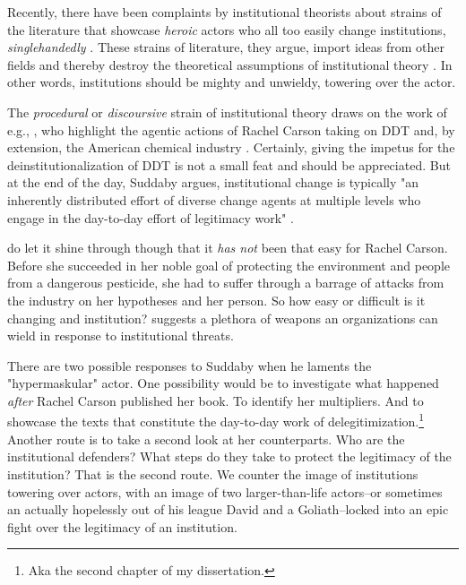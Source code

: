 
Recently, there have been complaints by institutional theorists about strains of the literature that showcase \textit{heroic} actors who all too easily change institutions, \textit{singlehandedly} \citep[e.g.,][]{Suddaby2017}. These strains of literature, they argue, import ideas from other fields and thereby destroy the  theoretical assumptions of institutional theory \citep{Suddaby2010}. In other words, institutions should be mighty and unwieldy, towering over the actor.

The \textit{procedural} or \textit{discoursive} strain of institutional theory draws on the work of e.g., \citet{Maguire2009}, who highlight the agentic actions of Rachel Carson taking on DDT and, by extension, the American chemical industry \citep{Suddaby2017}. Certainly, giving the impetus for the deinstitutionalization of DDT is not a small feat and should be appreciated. But at the end of the day, Suddaby argues, institutional change is typically "an inherently distributed effort of diverse change agents at multiple levels who engage in the day-to-day effort of legitimacy work" \citep[p. 462]{Suddaby2017}.

\citet{Maguire2009} do let it shine through though that it \textit{has not} been that easy for Rachel Carson. Before she succeeded in her noble goal of protecting the environment and people from a dangerous pesticide, she had to suffer through a barrage of attacks from the industry on her hypotheses and her person. So how easy or difficult is it changing and institution? \citet{Oliver1991} suggests a plethora of weapons an organizations can wield in response to institutional threats. 

There are two possible responses to Suddaby when he laments the "hypermaskular" \citep{Suddaby2010,Suddaby2017} actor. One possibility would be to investigate what happened \textit{after} Rachel Carson published her book. To identify her multipliers. And to showcase the texts that constitute the day-to-day work of delegitimization.\footnote{Aka the second chapter of my dissertation.} Another route is to take a second look at her counterparts. Who are the institutional defenders? What steps do they take to protect the legitimacy of the institution? That is the second route. We counter the image of institutions towering over actors, with an image of two larger-than-life actors--or sometimes an actually hopelessly out of his league David and a Goliath--locked into an epic fight over the legitimacy of an institution.

